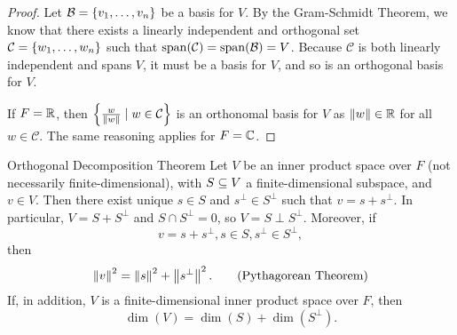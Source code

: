 \documentclass[class=article, crop=false]{standalone}
\begin{document}
  \begin{proof}
    Let $\mathcal{B} = \left\{v_1,\dotsc,v_n\right\}$ be a basis for $V$. By the Gram-Schmidt Theorem, we know that there exists a linearly independent and orthogonal set $\mathcal{C} = \left\{w_1,\dotsc,w_n\right\}$ such that $\operatorname{span}(\mathcal{C}) = \operatorname{span}(\mathcal{B}) = V$. Because $\mathcal{C}$ is both linearly independent and spans $V$, it must be a basis for $V$, and so is an orthogonal basis for $V$. \par
    If $F = \mathbb{R}$, then $\left\{\frac{w}{\left\lVert w\right\rVert}\mid w\in \mathcal{C}\right\}$ is an orthonomal basis for $V$ as $\left\lVert w\right\rVert\in \mathbb{R}$ for all $w\in \mathcal{C}$. The same reasoning applies for $F = \mathbb{C}$.
  \end{proof}
  \newpage
  \begin{theorem}{Orthogonal Decomposition Theorem}
    Let $V$ be an inner product space over $F$ (not necessarily finite-dimensional), with $S\subseteq V$ a finite-dimensional subspace, and $v\in V$. Then there exist unique $s\in S$ and $s^\perp\in S^\perp$ such that $v = s + s^\perp$. In particular, $V = S + S^\perp$ and $S\cap S^\perp = 0$, so $V = S\perp S^\perp$. Moreover, if 
    \[
      v = s + s^\perp, s\in S, s^\perp\in S^\perp,
    \]
    then
    \[
      \left\lVert v\right\rVert^2 = \left\lVert s\right\rVert^2 + \left\lVert s^\perp\right\rVert^2. \tag{Pythagorean Theorem}
    \]
    If, in addition, $V$ is a finite-dimensional inner product space over $F$, then
    \[
      \dim(V) = \dim(S) + \dim(S^\perp).
    \]
  \end{theorem}
\end{document}
